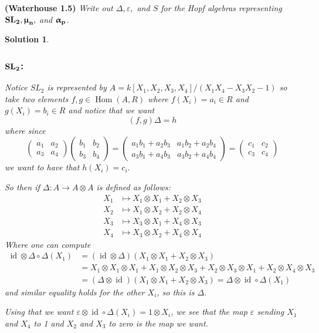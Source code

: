 \documentclass[12pt]{article}
\theoremstyle{nonumberbreak}
\newtheorem{sol}{Solution}
\theoremstyle{changebreak}
\theoremstyle{nonumberplain}
\theoremstyle{change}
\newenvironment{wprob}[1]{\begin{prob}{\normalfont\bfseries (Waterhouse #1) }\itshape}{\end{prob}}
\DeclareMathOperator{\Hom}{Hom}
\DeclareMathOperator{\id}{id}
\newcommand*{\SL}[1]{\ensuremath\mathbf{SL_#1}}
\newcommand*{\mun}[1]{\ensuremath\mathbf{\bm\upmu_#1}}
\newcommand*{\alp}[1]{\ensuremath\mathbf{\bm\upalpha_#1}}
\begin{document}
\begin{wprob}{1.5}
	Write out $\Delta,\varepsilon,$ and $S$ for the Hopf algebras representing $\SL{2}, \mun{n},$ and $\alp{p}$.
\end{wprob}
\begin{sol}
	\subsubsection*{$\SL{2}$:}
	Notice $SL_2$ is represented by $A=k[X_1,X_2,X_3,X_4]/(X_1X_4-X_3X_2-1)$ so take two elements
	$f,g\in\Hom(A,R)$ where $f(X_i)=a_i\in R$ and $g(X_i)=b_i\in R$ and notice that we want
	\[(f,g)\Delta=h\]
	where since
	\[\begin{pmatrix}
		a_1 & a_2\\ a_3 & a_4
	\end{pmatrix}\begin{pmatrix}
		b_1 & b_2\\ b_3 & b_4
	\end{pmatrix}=\begin{pmatrix}
		a_1b_1+a_2b_3 & a_1b_2+a_2b_4\\ a_3b_1+a_4b_3 & a_3b_2+a_4b_4
	\end{pmatrix}=\begin{pmatrix}
		c_1 & c_2\\ c_3 & c_4
	\end{pmatrix}\]
	we want to have that $h(X_i)=c_i.$

	So then if $\Delta:A\to A\otimes A$ is defined as follows:
	\begin{align*}
		X_1&\mapsto X_1\otimes X_1+X_2\otimes X_3\\
		X_2&\mapsto X_1\otimes X_2 +X_2\otimes X_4\\
		X_3&\mapsto X_3\otimes X_1+X_4\otimes X_3\\
		X_4&\mapsto X_3\otimes X_2+X_4\otimes X_4
	\end{align*}
	Where one can compute
	\begin{align*}
		\id\otimes\Delta\circ \Delta (X_1)&= (\id\otimes\Delta)(X_1\otimes X_1+X_2\otimes X_3)\\
		&= X_1\otimes X_1\otimes X_1 + X_1\otimes X_2\otimes X_3 + X_2\otimes X_3\otimes X_1 + X_2\otimes X_4\otimes X_3\\
		&= (\Delta\otimes\id)(X_1\otimes X_1+X_2\otimes X_3)=\Delta\otimes\id\circ \Delta (X_1)
	\end{align*}
	and similar equality holds for the other $X_i$, so this is $\Delta$. 

	Using that we want $\varepsilon\otimes\id\circ \Delta(X_i)=1\otimes X_i$, we see that the map
	$\varepsilon$ sending $X_1$ and $X_4$ to 1 and $X_2$ and $X_3$ to zero is the map we want.


\end{sol}
\end{document}
